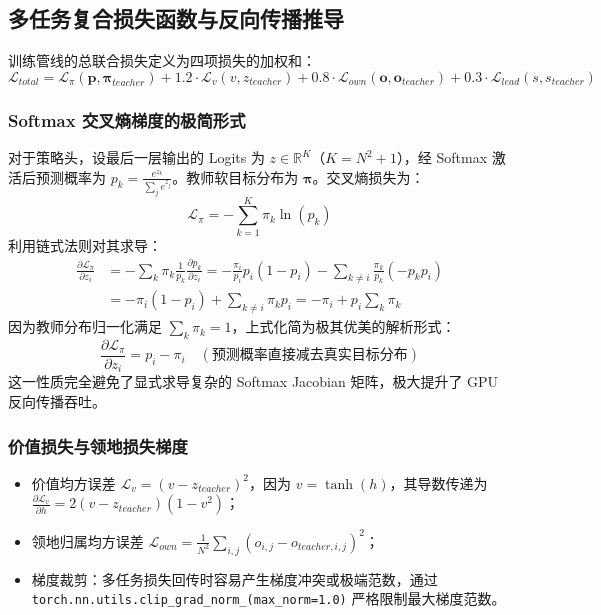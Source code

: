 \documentclass[11pt,a4paper]{ctexart}
\newcommand{\rb}[1]{\ensuremath{\mathbb{R}^{#1}}}
\begin{document}
\subsection{多任务复合损失函数与反向传播推导}

训练管线的总联合损失定义为四项损失的加权和：
\begin{equation}
\mathcal{L}_{total} = \mathcal{L}_{\pi}(\mathbf{p}, \boldsymbol{\pi}_{teacher}) + 1.2 \cdot \mathcal{L}_{v}(v, z_{teacher}) + 0.8 \cdot \mathcal{L}_{own}(\mathbf{o}, \mathbf{o}_{teacher}) + 0.3 \cdot \mathcal{L}_{lead}(s, s_{teacher})
\end{equation}

\subsubsection{Softmax 交叉熵梯度的极简形式}
对于策略头，设最后一层输出的 Logits 为 $z \in \rb{K}$（$K=N^2+1$），经 Softmax 激活后预测概率为 $p_k = \frac{e^{z_k}}{\sum_j e^{z_j}}$。教师软目标分布为 $\boldsymbol{\pi}$。交叉熵损失为：
\begin{equation}
\mathcal{L}_{\pi} = - \sum_{k=1}^K \pi_k \ln(p_k)
\end{equation}
利用链式法则对其求导：
\begin{align}
\frac{\partial \mathcal{L}_{\pi}}{\partial z_i} &= - \sum_k \pi_k \frac{1}{p_k} \frac{\partial p_k}{\partial z_i} = - \frac{\pi_i}{p_i} p_i(1-p_i) - \sum_{k \neq i} \frac{\pi_k}{p_k} (-p_k p_i) \\
&= - \pi_i (1-p_i) + \sum_{k \neq i} \pi_k p_i = - \pi_i + p_i \sum_k \pi_k
\end{align}
因为教师分布归一化满足 $\sum_k \pi_k = 1$，上式化简为极其优美的解析形式：
\begin{equation}
\frac{\partial \mathcal{L}_{\pi}}{\partial z_i} = p_i - \pi_i \quad (\text{预测概率直接减去真实目标分布})
\end{equation}
这一性质完全避免了显式求导复杂的 Softmax Jacobian 矩阵，极大提升了 GPU 反向传播吞吐。

\subsubsection{价值损失与领地损失梯度}
\begin{itemize}
  \item 价值均方误差 $\mathcal{L}_v = (v - z_{teacher})^2$，因为 $v = \tanh(h)$，其导数传递为 $\frac{\partial \mathcal{L}_v}{\partial h} = 2(v - z_{teacher})(1 - v^2)$；
  \item 领地归属均方误差 $\mathcal{L}_{own} = \frac{1}{N^2} \sum_{i,j} (o_{i,j} - o_{teacher, i,j})^2$；
  \item 梯度裁剪：多任务损失回传时容易产生梯度冲突或极端范数，通过 \texttt{torch.nn.utils.clip\_grad\_norm\_(max\_norm=1.0)} 严格限制最大梯度范数。
\end{itemize}
\end{document}
